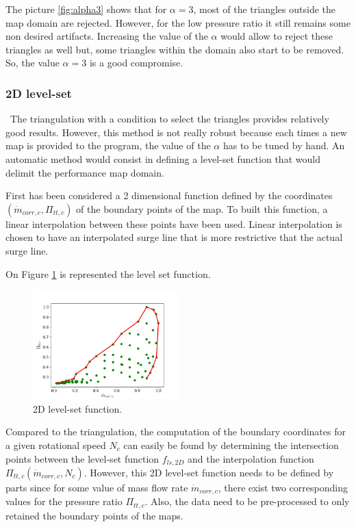 The picture \ref{fig:alpha3} shows that for $\alpha=3$, most of the triangles outside the map domain are rejected. However, for the low pressure ratio it still remains some non desired artifacts. Increasing the value of the $\alpha$ would allow to reject these
triangles as well but, some triangles within the domain also start to be removed. So, the value $\alpha=3$ is a good compromise.

\subsubsection{2D level-set}
\quad\ The triangulation with a condition to select the triangles provides relatively good results. However, this method is not really robust because each times a new map is provided to the program, the value of the $\alpha$ has to be tuned by hand. An automatic method would consist in defining a level-set function that would delimit the performance map domain.

First has been considered a 2 dimensional function defined by the coordinates $(\dot{m}_{corr,c},\Pi_{tt,c})$ of the boundary points of the map. To built this function, a linear interpolation between these points have been used. Linear interpolation is chosen to have an interpolated surge line that is more restrictive that the actual surge line.

On Figure \ref{fig:C7_LS2D} is represented the level set function.

\begin{figure}[h]
    \centering
    \includegraphics[width=0.5\textwidth]{Comp_map/2D_LS.png}
    \caption{2D level-set function.}
    \label{fig:C7_LS2D}
\end{figure}

Compared to the triangulation, the computation of the boundary coordinates for a given rotational speed $N_c$ can easily be found by determining the intersection points between the level-set function $f_{ls,2D}$ and the interpolation function $\Pi_{tt,c}(\dot{m}_{corr,c},N_c)$. 
However, this 2D level-set function needs to be defined by parts since for some value of mass flow rate $\dot{m}_{corr,c}$, there exist two corresponding values for the pressure ratio $\Pi_{tt,c}$. Also, the data need to be pre-processed to only retained the boundary points of the maps. 

